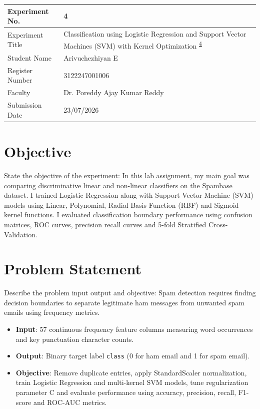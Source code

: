 \documentclass[12pt,a4paper]{article}
\begin{document}
\begin{tabular}{|p{4cm}|p{11cm}|}
\hline
Experiment No. & 4 \\ \hline
Experiment Title & Classification using Logistic Regression and Support Vector Machines (SVM) with Kernel Optimization \textsuperscript{\href{https://github.com/arivuchezhiyan/Machine_Learning/tree/main/experiment_4}{4}} \\ \hline
Student Name & Arivuchezhiyan E \\ \hline
Register Number & 3122247001006 \\ \hline
Faculty & Dr. Poreddy Ajay Kumar Reddy \\ \hline
Submission Date & 23/07/2026 \\ \hline
\end{tabular}

\section{Objective}
State the objective of the experiment:
In this lab assignment, my main goal was comparing discriminative linear and non-linear classifiers on the Spambase dataset. I trained Logistic Regression along with Support Vector Machine (SVM) models using Linear, Polynomial, Radial Basis Function (RBF) and Sigmoid kernel functions. I evaluated classification boundary performance using confusion matrices, ROC curves, precision recall curves and 5-fold Stratified Cross-Validation.

\section{Problem Statement}
Describe the problem input output and objective:
Spam detection requires finding decision boundaries to separate legitimate ham messages from unwanted spam emails using frequency metrics.
\begin{itemize}
\item \textbf{Input}: 57 continuous frequency feature columns measuring word occurrences and key punctuation character counts.
\item \textbf{Output}: Binary target label \texttt{class} (0 for ham email and 1 for spam email).
\item \textbf{Objective}: Remove duplicate entries, apply StandardScaler normalization, train Logistic Regression and multi-kernel SVM models, tune regularization parameter C and evaluate performance using accuracy, precision, recall, F1-score and ROC-AUC metrics.
\end{itemize}
\end{document}
